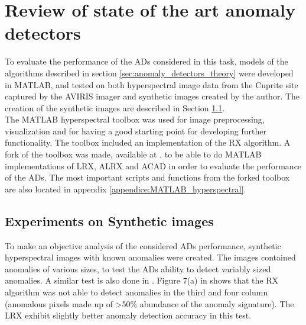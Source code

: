 
\chapter{Review of state of the art anomaly detectors}
\label{chapter:review_anomaly_detectors}
To evaluate the performance of the ADs considered in this task, models of the algorithms described in section \ref{sec:anomaly_detectors_theory} were developed in MATLAB, and tested on both hyperspectral image data from the Cuprite site \cite{Cuprite_data} captured by the AVIRIS imager and synthetic images created by the author. The creation of the synthetic images are described in Section \ref{sec:synthetic_images}.
\\

The MATLAB hyperspectral toolbox \cite{MATLAB_hyperspectral_toolbox} was used for image preprocessing, visualization and for having a good starting point for developing further functionality. The toolbox included an implementation of the RX algorithm. A fork of the toolbox was made, available at \cite{MATLAB_hyperspectral_toolbox_fork}, to be able to do MATLAB implementations of LRX, ALRX and ACAD in order to evaluate the performance of the ADs. The most important scripts and functions from the forked toolbox are also located in appendix \ref{appendice:MATLAB_hyperspectral}.

\section{Experiments on Synthetic images}
\label{sec:synthetic_images}
To make an objective analysis  of the considered ADs performance, synthetic hyperspectral images with known anomalies were created. The images contained anomalies of various sizes, to test the ADs ability to detect variably sized anomalies. A similar test is also done in \cite{global_and_local_rx}. Figure 7(a) in \cite{global_and_local_rx} shows that the RX algorithm was not able to detect anomalies in the third and four column (anomalous pixels made up of >50\% abundance of the anomaly signature). The LRX exhibit slightly better anomaly detection accuracy in this test.
\\

